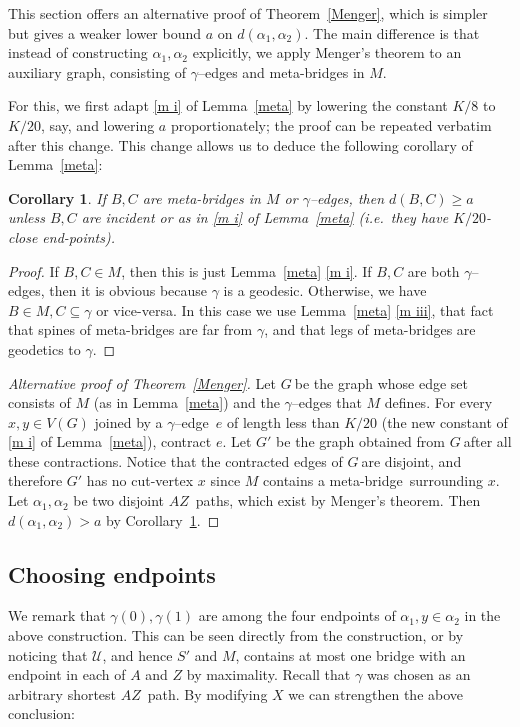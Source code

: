 \documentclass[a4paper]{article}
\newtheorem{corollary}[proposition]{Corollary}
\newcommand{\cu}{\ensuremath{\mathcal U}}
\newcommand{\pth}[2]{\ensuremath{#1}\text{--}\ensuremath{#2}~path}
\newcommand{\pths}[2]{\ensuremath{#1}\text{--}\ensuremath{#2}~paths}
\newcommand{\g}{\ensuremath{G\ }}
\newcommand{\Lr}[1]{Lemma~\ref{#1}}
\newcommand{\Tr}[1]{Theorem~\ref{#1}}
\newcommand{\Cr}[1]{Corollary~\ref{#1}}
\newcommand{\Fe}{For every}
\newcommand{\mb}{meta-bridge}
\newcommand{\game}{$\gamma$--edge}
\begin{document}
This section offers an alternative proof of \Tr{Menger}, which is simpler but gives a weaker lower bound $a$ on $d(\alpha_1,\alpha_2)$. The main difference is that instead of constructing $\alpha_1,\alpha_2$ explicitly, we apply Menger's theorem to an auxiliary graph, consisting of \game s and \mb s in $M$.

For this, we first adapt \ref{m i} of \Lr{meta} by lowering the constant $K/8$ to $K/20$, say, and lowering $a$ proportionately; the proof can be repeated verbatim after this change. This change allows us to deduce the following corollary of \Lr{meta}: 
\begin{corollary} \label{cor meta}
If $B,C$ are \mb s in $M$ or \game s, then $d(B,C)\geq a$ unless $B,C$ are incident or as in \ref{m i} of \Lr{meta} (i.e.\ they have $K/20$-close end-points).
\end{corollary}
\begin{proof}
If $B,C\in M$, then this is just \Lr{meta} \ref{m i}. If $B,C$ are both \game s, then it is obvious because $\gamma$ is a geodesic. Otherwise, we have $B\in M, C\subseteq \gamma$ or vice-versa. In this case we use \Lr{meta} \ref{m iii}, that fact that spines of \mb s are far from $\gamma$, and that legs of \mb s are geodetics to $\gamma$.
\end{proof}

\begin{proof}[Alternative proof of \Tr{Menger}]
Let \g be the graph whose edge set consists of $M$ (as in \Lr{meta}) and the \game s that $M$ defines. \Fe\ $x,y\in V(G)$ joined by a \game\ $e$ of length less than $K/20$ (the new constant of \ref{m i} of \Lr{meta}), contract $e$. Let $G'$ be the graph obtained from \g after all these contractions. Notice that the contracted edges of \g are disjoint, and therefore  $G'$ has no cut-vertex $x$ since $M$ contains a \mb\ surrounding $x$. Let $\alpha_1,\alpha_2$ be two disjoint \pths{A}{Z}, which exist by Menger's theorem. Then $d(\alpha_1,\alpha_2)>a$ by \Cr{cor meta}.
\end{proof}



\subsection{Choosing endpoints}
We remark that $\gamma(0),\gamma(1)$ are among the four endpoints of $\alpha_1, y\in \alpha _2$ in the above construction. This can be seen directly from the construction, or by noticing that $\cu$, and hence $S'$ and $M$, contains at most one bridge with an endpoint in each of $A$ and $Z$ by maximality. Recall that $\gamma$ was chosen as an arbitrary shortest \pth{A}{Z}. By modifying $X$ we can strengthen the above conclusion:
\end{document}
